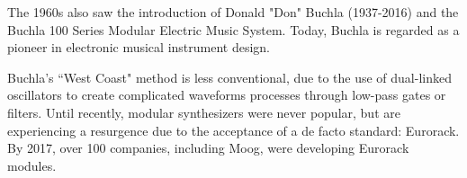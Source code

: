 The 1960s also saw the introduction of Donald "Don" Buchla (1937-2016) and the Buchla 100 Series Modular Electric Music System. Today, Buchla is regarded as a pioneer in electronic musical instrument design.

Buchla's ``West Coast" method is less conventional, due to the use of dual-linked oscillators to create complicated waveforms processes through low-pass gates or filters. Until recently, modular synthesizers were never popular, but are experiencing a resurgence due to the acceptance of a de facto standard: Eurorack. By 2017, over 100 companies, including Moog, were developing Eurorack modules.